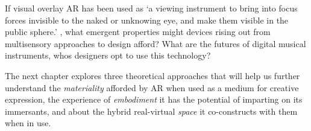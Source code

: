 If visual overlay AR has been used as `a viewing instrument to bring into focus forces invisible to the naked or unknowing eye, and make them visible in the public sphere.' \citep{thiel2011}, what emergent properties might devices rising out from multisensory approaches to design afford? What are the futures of digital musical instruments, whos designers opt to use this technology?


The next chapter explores three theoretical approaches that will help us further understand the \textit{materiality} afforded by AR when used as a medium for creative expression, the experience of \textit{embodiment} it has the potential of imparting on its immersants, and about the hybrid real-virtual \textit{space} it co-constructs with them when in use.
